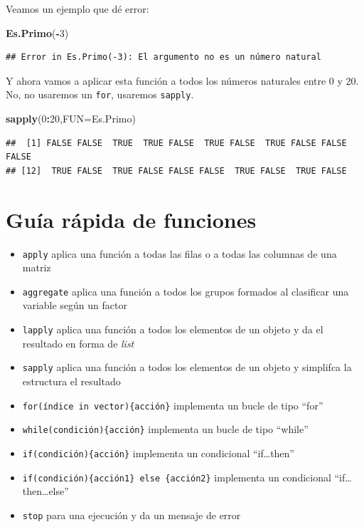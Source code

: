 \documentclass[]{book}
\newenvironment{Shaded}{\begin{snugshade}}{\end{snugshade}}
\newcommand{\DataTypeTok}[1]{\textcolor[rgb]{0.13,0.29,0.53}{#1}}
\newcommand{\DecValTok}[1]{\textcolor[rgb]{0.00,0.00,0.81}{#1}}
\newcommand{\KeywordTok}[1]{\textcolor[rgb]{0.13,0.29,0.53}{\textbf{#1}}}
\newcommand{\NormalTok}[1]{#1}
\newcommand{\OperatorTok}[1]{\textcolor[rgb]{0.81,0.36,0.00}{\textbf{#1}}}
\theoremstyle{definition}
\theoremstyle{definition}
\theoremstyle{definition}
\theoremstyle{remark}
\begin{document}
Veamos un ejemplo que dé error:

\begin{Shaded}
\begin{Highlighting}[]
\KeywordTok{Es.Primo}\NormalTok{(}\OperatorTok{-}\DecValTok{3}\NormalTok{)}
\end{Highlighting}
\end{Shaded}

\begin{verbatim}
## Error in Es.Primo(-3): El argumento no es un número natural
\end{verbatim}

Y ahora vamos a aplicar esta función a todos los números naturales entre 0 y 20. No, no usaremos un \texttt{for}, usaremos \texttt{sapply}.

\begin{Shaded}
\begin{Highlighting}[]
\KeywordTok{sapply}\NormalTok{(}\DecValTok{0}\OperatorTok{:}\DecValTok{20}\NormalTok{,}\DataTypeTok{FUN=}\NormalTok{Es.Primo)}
\end{Highlighting}
\end{Shaded}

\begin{verbatim}
##  [1] FALSE FALSE  TRUE  TRUE FALSE  TRUE FALSE  TRUE FALSE FALSE FALSE
## [12]  TRUE FALSE  TRUE FALSE FALSE FALSE  TRUE FALSE  TRUE FALSE
\end{verbatim}

\hypertarget{guia-rapida-de-funciones-3}{%
\section{Guía rápida de funciones}\label{guia-rapida-de-funciones-3}}

\begin{itemize}
\item
  \texttt{apply} aplica una función a todas las filas o a todas las columnas de una matriz
\item
  \texttt{aggregate} aplica una función a todos los grupos formados al clasificar una variable según un factor
\item
  \texttt{lapply} aplica una función a todos los elementos de un objeto y da el resultado en forma de \emph{list}
\item
  \texttt{sapply} aplica una función a todos los elementos de un objeto y simplifca la estructura el resultado
\item
  \texttt{for(índice\ in\ vector)\{acción\}} implementa un bucle de tipo ``for''
\item
  \texttt{while(condición)\{acción\}} implementa un bucle de tipo ``while''
\item
  \texttt{if(condición)\{acción\}} implementa un condicional ``if\ldots{}then''
\item
  \texttt{if(condición)\{acción1\}\ else\ \{acción2\}} implementa un condicional ``if\ldots{}then\ldots{}else''
\item
  \texttt{stop} para una ejecución y da un mensaje de error
\end{itemize}
\end{document}
